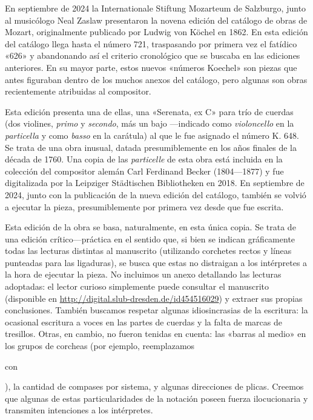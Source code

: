 En septiembre de 2024 la Internationale Stiftung Mozarteum de Salzburgo, junto al musicólogo Neal Zaslaw presentaron la novena edición del catálogo de obras de Mozart, originalmente publicado por Ludwig von Köchel en 1862. En esta edición del catálogo llega hasta el número 721, traspasando por primera vez el fatídico «626» y abandonando así el criterio cronológico que se buscaba en las ediciones anteriores. En su mayor parte, estos nuevos «números Koechel» son piezas que antes figuraban dentro de los muchos anexos del catálogo, pero algunas son obras recientemente atribuidas al compositor. 

Esta edición presenta una de ellas, una «Serenata, ex C» para trío de cuerdas (dos violines, \emph{primo} y \emph{secondo}, más un bajo ---indicado como \emph{violoncello} en la \emph{particella} y como \emph{basso} en la carátula) al que le fue asignado el número K. 648. Se trata de una obra inusual, datada presumiblemente en los años finales de la década de 1760. Una copia de las \emph{particelle} de esta obra está incluida en la colección del compositor alemán Carl Ferdinand Becker (1804—1877) y fue digitalizada por la Leipziger Städtischen Bibliotheken en 2018. En septiembre de 2024, junto con la publicación de la nueva edición del catálogo, también se volvió a ejecutar la pieza, presumiblemente por primera vez desde que fue escrita. 

Esta edición de la obra se basa, naturalmente, en esta única copia. Se trata de una edición crítico—práctica en el sentido que, si bien se indican gráficamente todas las lecturas distintas al manuscrito (utilizando corchetes rectos y líneas punteadas para las ligaduras), se busca que estas no distraigan a los intérpretes a la hora de ejecutar la pieza. No incluimos un anexo detallando las lecturas adoptadas: el lector curioso simplemente puede consultar el manuscrito (disponible en \href{http://digital.slub-dresden.de/id454516029}{http://digital.slub-dresden.de/id454516029}) y extraer sus propias conclusiones. También buscamos respetar algunas idiosincrasias de la escritura: la ocasional escritura a voces en las partes de cuerdas y la falta de marcas de tresillos. Otras, en cambio, no fueron tenidas en cuenta: las «barras al medio» en los grupos de corcheas (por ejemplo, reemplazamos
    con 
), la cantidad de compases por sistema, y algunas direcciones de plicas. Creemos que algunas de estas particularidades de la notación poseen fuerza ilocucionaria y transmiten intenciones a los intérpretes. 


